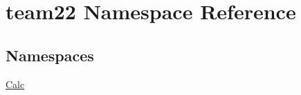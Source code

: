 \hypertarget{namespaceteam22}{}\section{team22 Namespace Reference}
\label{namespaceteam22}
\subsection*{Namespaces}
\begin{DoxyCompactItemize}
\item 
 \hyperlink{namespaceteam22_1_1_calc}{Calc}
\end{DoxyCompactItemize}
